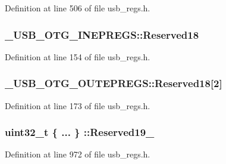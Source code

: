 Definition at line 506 of file usb\-\_\-regs.\-h.

\hypertarget{group___u_s_b___o_t_g___d_r_i_v_e_r_ga656e65007c1967f02d8000c79d70f739}{
\subsubsection[{Reserved18}]{ \-\_\-\-U\-S\-B\-\_\-\-O\-T\-G\-\_\-\-I\-N\-E\-P\-R\-E\-G\-S\-::\-Reserved18}}\label{group___u_s_b___o_t_g___d_r_i_v_e_r_ga656e65007c1967f02d8000c79d70f739}


Definition at line 154 of file usb\-\_\-regs.\-h.

\hypertarget{group___u_s_b___o_t_g___d_r_i_v_e_r_ga482e8418ccf987e052376b2b1b61410e}{
\subsubsection[{Reserved18}]{ \-\_\-\-U\-S\-B\-\_\-\-O\-T\-G\-\_\-\-O\-U\-T\-E\-P\-R\-E\-G\-S\-::\-Reserved18\mbox{[}2\mbox{]}}}\label{group___u_s_b___o_t_g___d_r_i_v_e_r_ga482e8418ccf987e052376b2b1b61410e}


Definition at line 173 of file usb\-\_\-regs.\-h.

\hypertarget{group___u_s_b___o_t_g___d_r_i_v_e_r_ga9fea8df5de1cf6a08fc46a36f8089410}{
\subsubsection[{Reserved19\-\_\-31}]{\setlength{\rightskip}{0pt plus 5cm}uint32\-\_\-t \{ ... \} \-::Reserved19\-\_}}\label{group___u_s_b___o_t_g___d_r_i_v_e_r_ga9fea8df5de1cf6a08fc46a36f8089410}


Definition at line 972 of file usb\-\_\-regs.\-h.

